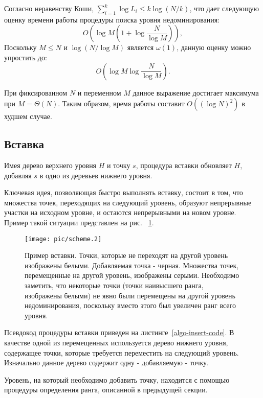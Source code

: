 Согласно неравенству Коши, $\sum_{i=1}^{k}{\log L_i} \le k \log (N / k)$, что дает следующую оценку 
времени работы процедуры поиска уровня недоминирования:
$$O\left(\log M \left(1 + \log{\frac{N}{\log M}}\right)\right),$$
Поскольку $M \le N$ и $\log(N / \log M)$ является $\omega(1)$, данную оценку можно упростить до:
$$O\left(\log M \log{\frac{N}{\log M}}\right).$$

При фиксированном $N$ и переменном $M$ данное выражение достигает максимума при $M = \Theta(N)$.
Таким образом, время работы составит $O((\log N)^2)$ в худшем случае.

\subsection{Вставка}\label{algo-insert}
Имея дерево верхнего уровня $H$ и точку $s$, процедура вставки обновляет $H$, добавляя
$s$ в одно из деревьев нижнего уровня.

Ключевая идея, позволяющая быстро выполнять вставку, состоит в том, что множества точек, переходящих
на следующий уровень, образуют непрерывные участки на исходном уровне, и остаются непрерывными на 
новом уровне. Пример такой ситуации представлен на рис. ~\ref{algo-insert-example}.

\begin{figure}
\centering
\texttt{[image: pic/scheme.2]}
\caption{
Пример вставки. Точки, которые не переходят на другой уровень изображены белыми. Добавляемая точка - 
черная. Множества точек, перемещенные на другой уровень, изображены серыми. Необходимо заметить, что 
некоторые точки (точки наивысшего ранга, изображены белыми) не явно были перемещены на другой уровень 
недоминирования, поскольку вместо этого был увеличен ранг всего уровня.
}\label{algo-insert-example}
\end{figure}

Псевдокод процедуры вставки приведен на листинге~\ref{algo-insert-code}.
В качестве одной из перемещенных используется дерево нижнего уровня, содержащее точки, которые
требуется переместить на следующий уровень. Изначально данное дерево содержит одну - добавляемую - 
точку.

Уровень, на который необходимо добавить точку, находится с помощью процедуры определения ранга,
описанной в предыдущей секции.

